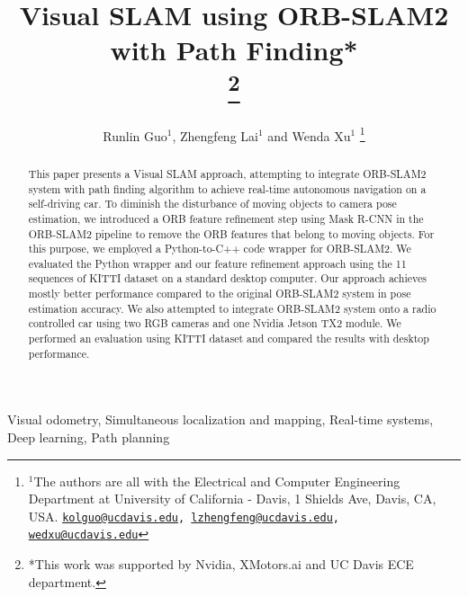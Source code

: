 \documentclass[letterpaper, 10 pt, conference]{IEEEtran}
\begin{document}
\title{\LARGE \bf
Visual SLAM using ORB-SLAM2 with Path Finding*\\
\thanks{*This work was supported by Nvidia, XMotors.ai and UC Davis ECE 
        department.}
}

\author{Runlin Guo$^{1}$, Zhengfeng Lai$^{1}$ and Wenda Xu$^{1}$%
\thanks{$^{1}$The authors are all with the Electrical and Computer 
        Engineering Department at University of California - Davis, 
        1 Shields Ave, Davis, CA, USA. 
        {\tt\small \href{mailto:kolguo@ucdavis.edu}{kolguo@ucdavis.edu}, 
        \href{mailto:lzhengfeng@ucdavis.edu}{lzhengfeng@ucdavis.edu}, \newline 
        \href{mailto:wedxu@ucdavis.edu}{wedxu@ucdavis.edu}}}%
}

\maketitle
\begin{abstract}
This paper presents a Visual SLAM approach, attempting to integrate ORB-SLAM2 
\cite{c1} system with path finding algorithm to achieve real-time autonomous 
navigation on a self-driving car. To diminish the disturbance of moving objects 
to camera pose estimation, we introduced a ORB feature refinement step using 
Mask R-CNN in the ORB-SLAM2 pipeline to remove the ORB features that belong to 
moving objects. For this purpose, we employed a Python-to-C++ code wrapper for 
ORB-SLAM2. We evaluated the Python wrapper and our feature refinement approach 
using the 11 sequences of KITTI dataset on a standard desktop computer. Our 
approach achieves mostly better performance compared to the original ORB-SLAM2 
system in pose estimation accuracy. We also attempted to integrate ORB-SLAM2 
system onto a radio controlled car using two RGB cameras and one Nvidia Jetson 
TX2 module. We performed an evaluation using KITTI dataset and compared the 
results with desktop performance. 
\end{abstract}

\begin{IEEEkeywords}
Visual odometry, Simultaneous localization and mapping, Real-time systems, 
Deep learning, Path planning
\end{IEEEkeywords}
\end{document}
